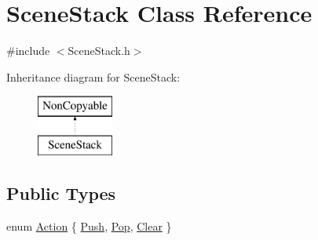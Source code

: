 \hypertarget{class_scene_stack}{}\section{Scene\+Stack Class Reference}
\label{class_scene_stack}


{\ttfamily \#include $<$Scene\+Stack.\+h$>$}

Inheritance diagram for Scene\+Stack\+:\begin{figure}[H]
\begin{center}
\leavevmode
\includegraphics[height=2.000000cm]{class_scene_stack}
\end{center}
\end{figure}
\subsection*{Public Types}
\begin{DoxyCompactItemize}
\item 
enum \hyperlink{class_scene_stack_ab8644e038aad992c6776dc3fb5fcc1f9}{Action} \{ \hyperlink{class_scene_stack_ab8644e038aad992c6776dc3fb5fcc1f9a6cd7480d27e0a88a4b67e2186757358d}{Push}, 
\hyperlink{class_scene_stack_ab8644e038aad992c6776dc3fb5fcc1f9a1d86b0e7cf0989e5717f70598e74fa95}{Pop}, 
\hyperlink{class_scene_stack_ab8644e038aad992c6776dc3fb5fcc1f9af03df5d6746e57023c22bb3548b93779}{Clear}
 \}
\end{DoxyCompactItemize}
